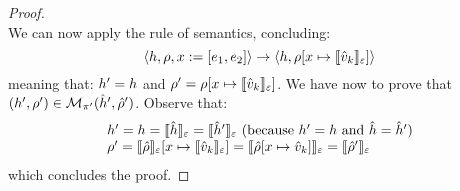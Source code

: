 \begin{proof}
$$$$
We can now apply the  rule of \jsil semantics, concluding: 
$$
   \semtrans{\heap, \store, \jvar := [\jsilexpr_1, \jsilexpr_2]}{\heap,  \store[\jvar \mapsto \semexpr{\sexprv_k}{\senv}]}
$$
meaning that: $\heap' = \heap$ and $\store' = \store[\jvar \mapsto \semexpr{\sexprv_k}{\senv}]$.
We have now to prove that $(\heap', \store') \in \smodels{\sheap', \sstore'}{\pc'}$.
Observe that: 
$$
\begin{array}{l}
\heap' = \heap = \semexpr{\sheap}{\senv}   = \semexpr{\sheap'}{\senv}  \text{ (because $\heap' = \heap$ and $ \sheap = \sheap'$)}
\\
 \store' =  \semexpr{\sstore}{\senv}[\jvar \mapsto \symbeval{\sexprv_k}{\senv}] 
    =  \semexpr{\sstore[\jvar \mapsto \sexprv_k]}{\senv} 
    =  \semexpr{\sstore'}{\senv}
\end{array}
$$
 which concludes the proof. 
\vspace{6pt}


\end{proof}
